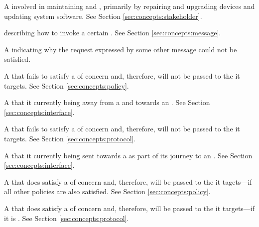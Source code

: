 {
A  involved in maintaining  and , primarily by repairing and upgrading devices and updating system software.
See Section \ref{sec:concepts:stakeholder}.

 describing how to invoke a certain .
See Section \ref{sec:concepts:message}.

A  indicating why the request expressed by some other message could not be satisfied.

A  that fails to satisfy a  of concern and, therefore, will not be passed to the  it targets.
See Section \ref{sec:concepts:policy}.

A  that it currently being  away from a  and towards an .
See Section \ref{sec:concepts:interface}.

A  that fails to satisfy a  of concern and, therefore, will not be passed to the  it targets.
See Section \ref{sec:concepts:protocol}.

A  that it currently being sent towards a  as part of its journey to an .
See Section \ref{sec:concepts:interface}.

A  that does satisfy a  of concern and, therefore, will be passed to the  it tagets---if all other policies are also satisfied.
See Section \ref{sec:concepts:policy}.

A  that does satisfy a  of concern and, therefore, will be passed to the  it targets---if it is .
See Section \ref{sec:concepts:protocol}.

}
